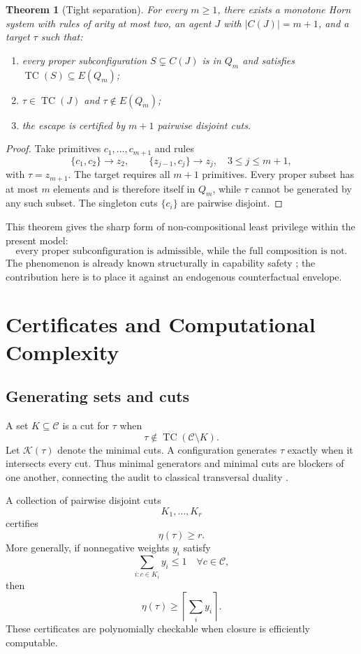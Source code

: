 \documentclass[11pt]{article}
\newtheorem{theorem}{Theorem}[section]
\newcommand{\TC}{\operatorname{TC}}
\newcommand{\etaMin}{\eta}
\newcommand{\Cset}{\mathcal C}
\begin{document}
\begin{theorem}[Tight separation]
For every $m\ge1$, there exists a monotone Horn system with rules of arity at most two, an agent $J$ with $|C(J)|=m+1$, and a target $\tau$ such that:
\begin{enumerate}[label=(\roman*)]
\item every proper subconfiguration $S\subsetneq C(J)$ is in $Q_m$ and satisfies $\TC(S)\subseteq E(Q_m)$;
\item $\tau\in\TC(J)$ and $\tau\notin E(Q_m)$;
\item the escape is certified by $m+1$ pairwise disjoint cuts.
\end{enumerate}
\end{theorem}

\begin{proof}
Take primitives $c_1,\ldots,c_{m+1}$ and rules
\[
\{c_1,c_2\}\to z_2,\qquad
\{z_{j-1},c_j\}\to z_j,\quad 3\le j\le m+1,
\]
with $\tau=z_{m+1}$. The target requires all $m+1$ primitives. Every proper subset has at most $m$ elements and is therefore itself in $Q_m$, while $\tau$ cannot be generated by any such subset. The singleton cuts $\{c_i\}$ are pairwise disjoint.
\end{proof}

This theorem gives the sharp form of non-compositional least privilege within the present model:
\[
\boxed{
\text{every proper subconfiguration is admissible, while the full composition is not.}
}
\]
The phenomenon is already known structurally in capability safety \cite{spera2026}; the contribution here is to place it against an endogenous counterfactual envelope.

\section{Certificates and Computational Complexity}

\subsection{Generating sets and cuts}

A set $K\subseteq\Cset$ is a cut for $\tau$ when
\[
\tau\notin\TC(\Cset\setminus K).
\]
Let $\mathcal K(\tau)$ denote the minimal cuts. A configuration generates $\tau$ exactly when it intersects every cut. Thus minimal generators and minimal cuts are blockers of one another, connecting the audit to classical transversal duality \cite{edmonds1965}.

A collection of pairwise disjoint cuts
\[
K_1,\ldots,K_r
\]
certifies
\[
\etaMin(\tau)\ge r.
\]
More generally, if nonnegative weights $y_i$ satisfy
\[
\sum_{i:c\in K_i}y_i\le1
\quad\forall c\in\Cset,
\]
then
\[
\etaMin(\tau)\ge\left\lceil\sum_i y_i\right\rceil.
\]
These certificates are polynomially checkable when closure is efficiently computable.
\end{document}
